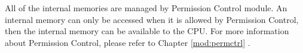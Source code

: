 \begin{tiplisting}
\vspace{-2em}
\begin{enumerate}
    All of the internal memories are managed by Permission Control module. An internal memory can only be accessed when it is allowed by Permission Control, then the internal memory can be available to the CPU. For more information about Permission Control, please refer to Chapter \ref{mod:permctrl} \textit{}.
\end{enumerate}
\end{tiplisting}
